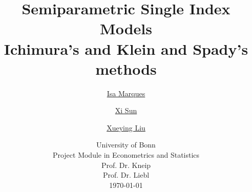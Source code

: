 \usepackage[backend=bibtex, natbib=true,style=numeric]{biblatex}
\setlength{\bibitemsep}{1.5ex}






    \title{
    \vspace{1cm}
    \Huge \textbf{ Semiparametric Single Index Models }\\ \Large Ichimura's and Klein and Spady's methods \\
    }
    
    \vspace{1cm}
    
    
    \author{\Large \href{mailto:first.student@smail.fh-koeln.de}{Isa Marques}\and \Large \href{mailto:second.student@smail.fh-koeln.de}{Xi Sun} \and \Large \href{mailto:second.student@smail.fh-koeln.de}{Xueying Liu}
    \vspace{1cm} }
    
    \date{
    \large University of Bonn \\ Project Module in Econometrics and Statistics\\ 
    \vspace{0.8cm}
    \large Prof. Dr. Kneip \\
    \large Prof. Dr. Liebl \\
    \vspace{1cm}
    \today
    }

    \maketitle
    \setlength{\parindent}{0pt}


